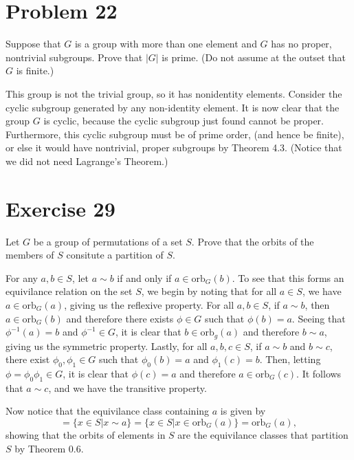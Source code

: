 \documentclass[12pt]{article}
\newcommand{\orb}{\mbox{orb}}
\begin{document}
\section*{Problem 22}

Suppose that $G$ is a group with more than one element and $G$ has no
proper, nontrivial subgroups.  Prove that $|G|$ is prime.  (Do not assume
at the outset that $G$ is finite.)

This group is not the trivial group, so it has nonidentity elements.
Consider the cyclic subgroup generated by any non-identity element.
It is now clear that the group $G$ is cyclic, because the cyclic subgroup
just found cannot be proper.  Furthermore, this cyclic subgroup must
be of prime order, (and hence be finite), or else it would have nontrivial, proper subgroups
by Theorem 4.3.  (Notice that we did not need Lagrange's Theorem.)

\section*{Exercise 29}

Let $G$ be a group of permutations of a set $S$.  Prove that the orbits of the
members of $S$ consitute a partition of $S$.

For any $a,b\in S$, let $a\sim b$ if and only if $a\in\orb_G(b)$.
To see that this forms an equivilance relation on the set $S$,
we begin by noting that for all $a\in S$, we have $a\in\orb_G(a)$,
giving us the reflexive property.  For all $a,b\in S$, if $a\sim b$,
then $a\in\orb_G(b)$ and therefore there exists $\phi\in G$ such
that $\phi(b)=a$.  Seeing that $\phi^{-1}(a)=b$ and $\phi^{-1}\in G$, it is clear
that $b\in\orb_g(a)$ and therefore $b\sim a$, giving us the symmetric property.
Lastly, for all $a,b,c\in S$, if $a\sim b$ and $b\sim c$, there exist $\phi_0,\phi_1\in G$
such that $\phi_0(b)=a$ and $\phi_1(c)=b$.  Then, letting $\phi=\phi_0\phi_1\in G$,
it is clear that $\phi(c)=a$ and therefore $a\in\orb_G(c)$.  It follows that $a\sim c$,
and we have the transitive property.

Now notice that the equivilance class containing $a$ is given by
\begin{equation*}
[a]=\{x\in S|x\sim a\}=\{x\in S|x\in\orb_G(a)\}=\orb_G(a),
\end{equation*}
showing that the orbits of elements in $S$ are the equivilance classes
that partition $S$ by Theorem 0.6.
\end{document}
